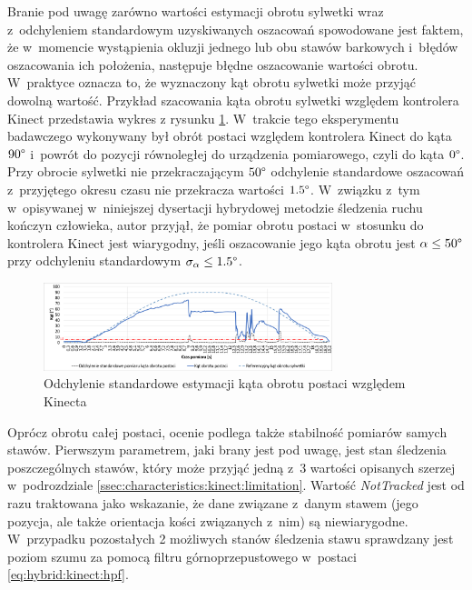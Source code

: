 Branie pod uwagę zarówno wartości estymacji obrotu sylwetki wraz z~odchyleniem standardowym uzyskiwanych oszacowań spowodowane jest faktem, że w~momencie wystąpienia okluzji jednego lub obu stawów barkowych i~błędów oszacowania ich położenia, następuje błędne oszacowanie wartości obrotu. W~praktyce oznacza to, że wyznaczony kąt obrotu sylwetki może przyjąć dowolną wartość. Przykład szacowania kąta obrotu sylwetki względem kontrolera Kinect przedstawia wykres z rysunku \ref{fig:hybrid:kinect:kinectRotationVariance}. W~trakcie tego eksperymentu badawczego wykonywany był obrót postaci względem kontrolera Kinect do kąta $90\degree$ i~powrót do pozycji równoległej do urządzenia pomiarowego, czyli do kąta $0\degree$. Przy obrocie sylwetki nie przekraczającym $50\degree$ odchylenie standardowe oszacowań z~przyjętego okresu czasu nie przekracza wartości $1.5\degree$. W~związku z~tym w~opisywanej w~niniejszej dysertacji hybrydowej metodzie śledzenia ruchu kończyn człowieka, autor przyjął, że pomiar obrotu postaci w~stosunku do kontrolera Kinect jest wiarygodny, jeśli oszacowanie jego kąta obrotu jest $\alpha \le 50\degree$ przy odchyleniu standardowym $\sigma_\alpha\le 1.5 \degree$.
												
\begin{savenotes}
	\begin{figure}[h]
		\centering
																																		
		\includegraphics[width=0.75\textwidth]{images/kinectRotationStdDev.png}
		\caption{Odchylenie standardowe estymacji kąta obrotu postaci względem Kinecta}
																																	
		\label{fig:hybrid:kinect:kinectRotationVariance}
	\end{figure}
\end{savenotes}
														
Oprócz obrotu całej postaci, ocenie podlega także stabilność pomiarów samych stawów. Pierwszym parametrem, jaki brany jest pod uwagę, jest stan śledzenia poszczególnych stawów, który może przyjąć jedną z~3 wartości opisanych szerzej w~podrozdziale \ref{ssec:characteristics:kinect:limitation}. Wartość \emph{NotTracked} jest od razu traktowana jako wskazanie, że dane związane z~danym stawem (jego pozycja, ale także orientacja kości związanych z~nim) są niewiarygodne. W~przypadku pozostałych 2 możliwych stanów śledzenia stawu sprawdzany jest poziom szumu za pomocą filtru górnoprzepustowego w~postaci \ref{eq:hybrid:kinect:hpf}. 
														
